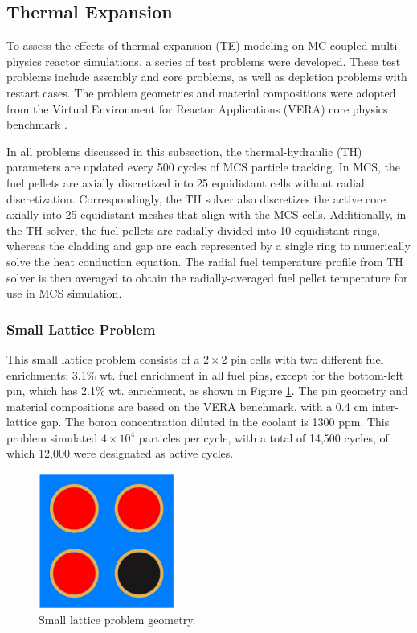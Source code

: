 \subsection{Thermal Expansion} \label{sec42}

To assess the effects of thermal expansion (TE) modeling on MC coupled multi-physics reactor simulations, a series of test problems were developed. These test problems include assembly and core problems, as well as depletion problems with restart cases. The problem geometries and material compositions were adopted from the Virtual Environment for Reactor Applications (VERA) core physics benchmark \cite{godfrey}.

In all problems discussed in this subsection, the thermal-hydraulic (TH) parameters are updated every 500 cycles of MCS particle tracking. In MCS, the fuel pellets are axially discretized into 25 equidistant cells without radial discretization. Correspondingly, the TH solver also discretizes the active core axially into 25 equidistant meshes that align with the MCS cells. Additionally, in the TH solver, the fuel pellets are radially divided into 10 equidistant rings, whereas the cladding and gap are each represented by a single ring to numerically solve the heat conduction equation. The radial fuel temperature profile from TH solver is then averaged to obtain the radially-averaged fuel pellet temperature for use in MCS simulation.


\subsubsection{Small Lattice Problem}

This small lattice problem consists of a $2\times2$ pin cells with two different fuel enrichments: 3.1\% wt. fuel enrichment in all fuel pins, except for the bottom-left pin, which has 2.1\% wt. enrichment, as shown in Figure \ref{fig_42a}. The pin geometry and material compositions are based on the VERA benchmark, with a 0.4 cm inter-lattice gap. The boron concentration diluted in the coolant is 1300 ppm. This problem simulated $4\times10^4$ particles per cycle, with a total of 14,500 cycles, of which 12,000 were designated as active cycles.

\begin{figure}[h]
    \centering
    \includegraphics[width=0.4\textwidth]{figs/xy_plot_noGrid.pdf}
    \caption{Small lattice problem geometry.}
    \label{fig_42a}
\end{figure}

